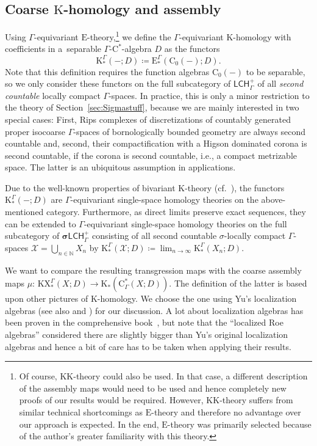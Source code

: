 \documentclass[11pt]{article}
\numberwithin{equation}{section}
\numberwithin{equation}{section}
\theoremstyle{definition}
\newcommand{\N}{\mathbb{N}}
\newcommand{\cX}{\mathcal{X}}
\newcommand{\Ct}{\mathrm{C}}
\newcommand{\Cz}{\Ct_0}
\newcommand{\categoryfont}[1]{\mathsf{#1}}
\newcommand{\sLCHp}[1][\Gamma]{\boldsymbol\sigma\categoryfont{LCH}_{#1}^+}
\newcommand{\LCHp}[1][\Gamma]{\categoryfont{LCH}_{#1}^+}
\newcommand{\KX}{\mathrm{KX}}
\newcommand{\K}{\mathrm{K}}
\newcommand{\KK}{\mathrm{KK}}
\newcommand{\EE}{\mathrm{E}}
\newcommand{\textCstar}{\ensuremath{\mathrm{C}^*\!}}
\newcommand{\Roe}{\mathrm{C}^*}
\newcommand{\blank}{-}
\begin{document}
\setcounter{section}{6}\setcounter{subsection}{3}\setcounter{thm}{6}\setcounter{equation}{1}\setcounter{footnote}{13}
\subsection[Coarse K-homology and assembly]{Coarse $\boldsymbol{\K}$-homology and assembly}\label{sec:Assembly}

Using $\Gamma$-equivariant $\EE$-theory,\footnote{Of course, $\KK$-theory could also be used. In that case, a different description of the assembly maps would need to be used and hence completely new proofs of our results would be required. However, $\KK$-theory suffers from similar technical shortcomings as $\EE$-theory and therefore no advantage over our approach is expected. In the end, $\EE$-theory was primarily selected because of the author's greater familiarity with this theory.} we define the $\Gamma$-equivariant $\K$-homology with coefficients in a~separable $\Gamma$-\textCstar-algebra $D$ as the functors
\[
\K^\Gamma_*(\blank;D)\coloneqq \EE^\Gamma_*(\Cz(\blank);D).
\]
Note that this definition requires the function algebras $\Cz(\blank)$ to be separable, so we only consider these functors on the full subcategory of $\LCHp$ of all \emph{second countable} locally compact $\Gamma$-spaces.
In practice, this is only a minor restriction to the theory of Section~\ref{sec:Sigmastuff}, because we are mainly interested in two special cases: First, Rips complexes of discretizations of countably generated proper isocoarse $\Gamma$-spaces of bornologically bounded geometry are always second countable and, second, their compactification with a Higson dominated corona is second countable, if the corona is second countable, i.e., a compact metrizable space. The latter is an ubiquitous assumption in applications.


Due to the well-known properties of bivariant $\K$-theory (cf.\ \cite[Chapter~6]{GueHigTro}), the functors $\K^\Gamma_*(\blank;D)$ are $\Gamma$-equivariant single-space homology theories on the above-mentioned category. Furthermore, as direct limits preserve exact sequences, they can be extended to $\Gamma$-equivariant single-space homology theories on the full subcategory of $\sLCHp$ consisting of all second countable $\sigma$-locally compact $\Gamma$-spaces $\cX=\bigcup_{n\in\N}X_n$ by
\(\K^\Gamma_*(\cX;D)\coloneqq\lim_{n\to\infty}\K^\Gamma_*(X_n;D)\).


We want to compare the resulting transgression maps with the coarse assembly maps $\mu$: $\KX^\Gamma_*(X;D)\to\K_*(\Roe_\Gamma(X;D))$. The definition of the latter is based upon other pictures of $\K$-homology.
We choose the one using Yu's localization algebras \cite{YuLocalization} (see also \cite{QiaoRoe} and \cite{EngelWulffZeidler}) for our discussion.
A lot about localization algebras has been proven in the comprehensive book~\cite{WillettYuHigherIndexTheory}, but note that the ``localized Roe algebras'' considered there are slightly bigger than Yu's original localization algebras and hence a bit of care has to be taken when applying their results.
\end{document}
